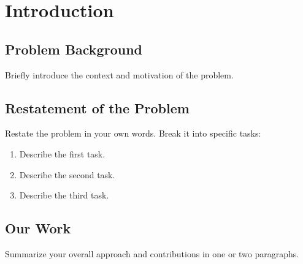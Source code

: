 \section{Introduction}

\subsection{Problem Background}
Briefly introduce the context and motivation of the problem.

\subsection{Restatement of the Problem}
Restate the problem in your own words. Break it into specific tasks:

\begin{enumerate}[label=Task \arabic*:,leftmargin=*]
  \item Describe the first task.
  \item Describe the second task.
  \item Describe the third task.
\end{enumerate}

\subsection{Our Work}
Summarize your overall approach and contributions in one or two paragraphs.
